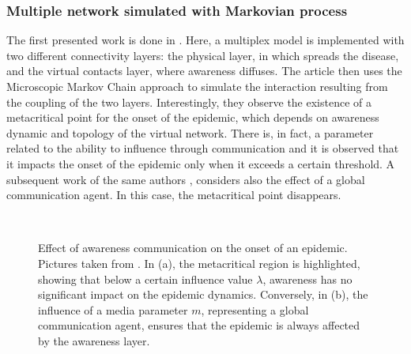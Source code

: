 \subsubsection{Multiple network simulated with Markovian process}
The first presented work is done in \cite{Granell_2014}. Here, a multiplex model is implemented with two different connectivity layers: the physical layer, in which spreads the disease, and the virtual contacts layer, where awareness diffuses. The article then uses the Microscopic Markov Chain approach to simulate the interaction resulting from the coupling of the two layers. Interestingly, they observe the existence of a metacritical point for the onset of the epidemic, which depends on awareness dynamic and topology of the virtual network. There is, in fact, a parameter related to the ability to influence through communication and it is observed that it impacts the onset of the epidemic only when it exceeds a certain threshold.
A subsequent work of the same authors \cite{Granell2013}, considers also the effect of a global communication agent. In this case, the metacritical point disappears. 
\begin{figure}[h]
	\centering
	 \quad
	 \\
	\caption[Metacritical effect]{Effect of awareness communication on the onset of an epidemic. Pictures taken from \cite{Granell2013, Granell_2014}. In (a), the metacritical region is highlighted, showing that below a certain influence value $\lambda$, awareness has no significant impact on the epidemic dynamics. Conversely, in (b), the influence of a media parameter $m$, representing a global communication agent, ensures that the epidemic is always affected by the awareness layer.}
	\label{fig:sir_example2}
\end{figure}



